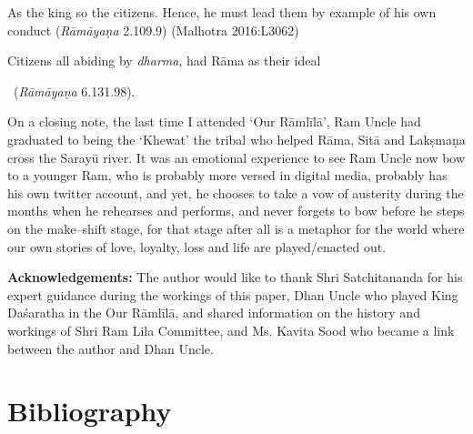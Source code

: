 \begin{myquote}
As the king so the citizens. Hence, he must lead them by example of his own conduct \hfill (\textit{Rāmāyaṇa} 2.109.9) (Malhotra 2016:L3062)
\end{myquote}

\vskip 4pt

\begin{myquote}
Citizens all abiding by \textit{dharma}, had Rāma as their ideal 

~\hfill (\textit{Rāmāyaṇa} 6.131.98).
\end{myquote}

On a closing note, the last time I attended ‘Our Rāmlīlā’, Ram Uncle had graduated to being the ‘Khewat’ the tribal who helped Rāma, Sitā and Lakṣmaṇa cross the Sarayū river. It was an emotional experience to see Ram Uncle now bow to a younger Ram, who is probably more versed in digital media, probably has his own twitter account, and yet, he chooses to take a vow of austerity during the months when he rehearses and performs, and never forgets to bow before he steps on the make–shift stage, for that stage after all is a metaphor for the world where our own stories of love, loyalty, loss and life are played/enacted out.

\newpage

\textbf{Acknowledgements:} The author would like to thank Shri Satchita\-nanda for his expert guidance during the workings of this paper, Dhan Uncle who played King Daśaratha in the Our Rāmlīlā, and shared information on the history and workings of Shri Ram Lila Committee, and Ms. Kavita Sood who became a link between the author and Dhan Uncle.


\section*{Bibliography}

